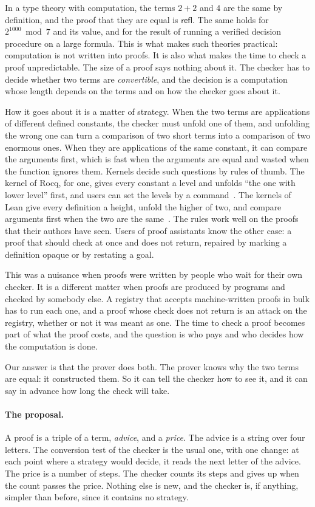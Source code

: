 \documentclass[acmsmall,nonacm,screen]{acmart}
\newcommand{\kw}[1]{\mathsf{#1}}
\newcommand{\refl}{\kw{refl}}
\begin{document}
In a type theory with computation, the terms $2 + 2$ and $4$ are the same by definition, and
the proof that they are equal is $\refl$. The same holds for $2^{1000} \bmod 7$ and its
value, and for the result of running a verified decision procedure on a large formula. This
is what makes such theories practical: computation is not written into proofs. It is also
what makes the time to check a proof unpredictable. The size of a proof says nothing about
it. The checker has to decide whether two terms are \emph{convertible}, and the decision is
a computation whose length depends on the terms and on how the checker goes about it.

How it goes about it is a matter of strategy. When the two terms are applications of
different defined constants, the checker must unfold one of them, and unfolding the wrong
one can turn a comparison of two short terms into a comparison of two enormous ones. When
they are applications of the same constant, it can compare the arguments first, which is
fast when the arguments are equal and wasted when the function ignores them. Kernels decide
such questions by rules of thumb. The kernel of Rocq, for one, gives every constant a level
and unfolds ``the one with lower level'' first, and users can set the levels by a
command~\cite{rocqstrategy}. The kernels of Lean give every definition a height, unfold the
higher of two, and compare arguments first when the two are the same~\cite{bailey2024}. The rules work well on the proofs that their authors have seen.
Users of proof assistants know the other case: a proof that should check at once and does not
return, repaired by marking a definition opaque or by restating a goal.

This was a nuisance when proofs were written by people who wait for their own checker. It is
a different matter when proofs are produced by programs and checked by somebody else. A
registry that accepts machine-written proofs in bulk has to run each one, and a proof whose
check does not return is an attack on the registry, whether or not it was meant as one. The
time to check a proof becomes part of what the proof costs, and the question is who pays and
who decides how the computation is done.

Our answer is that the prover does both. The prover knows why the two terms are equal: it
constructed them. So it can tell the checker how to see it, and it can say in advance how
long the check will take.

\paragraph{The proposal.} A proof is a triple of a term, \emph{advice}, and a \emph{price}.
The advice is a string over four letters. The conversion test of the checker is the usual
one, with one change: at each point where a strategy would decide, it reads the next letter
of the advice. The price is a number of steps. The checker counts its steps and gives up
when the count passes the price. Nothing else is new, and the checker is, if anything,
simpler than before, since it contains no strategy.
\end{document}
